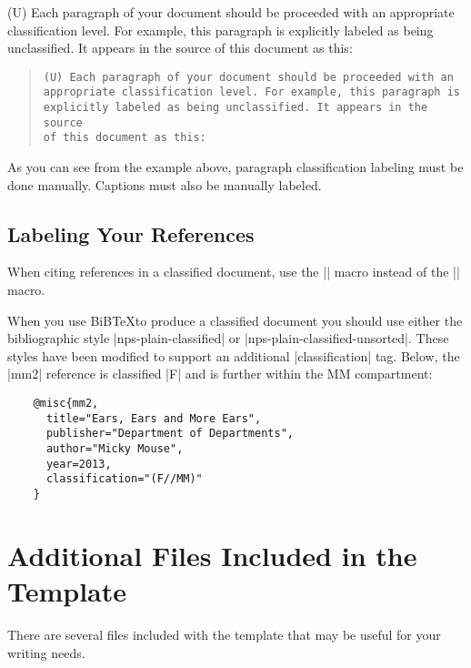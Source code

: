 (U) Each paragraph of your document should be proceeded with an
appropriate classification level. For example, this paragraph is
explicitly labeled as being unclassified. It appears in the source of
this document as this:

\begin{quotation}
\begin{Verbatim}[fontsize=\small]
(U) Each paragraph of your document should be proceeded with an
appropriate classification level. For example, this paragraph is
explicitly labeled as being unclassified. It appears in the source 
of this document as this:
\end{Verbatim}
\end{quotation}

As you can see from the example above, paragraph classification
labeling must be done manually. Captions must also be manually labeled.

\subsection{Labeling Your References}

When citing references in a classified document, use the
|\citeafter{}| macro instead of the |\cite{}| macro.

When you use BiB\TeX to produce a classified document you should use
either the bibliographic style |nps-plain-classified| or
|nps-plain-classified-unsorted|. These styles have been modified to
support an additional |classification| tag. Below, the |mm2| reference
is classified |F| and is further within the MM compartment:

\begin{Verbatim}
    @misc{mm2,
      title="Ears, Ears and More Ears",
      publisher="Department of Departments",
      author="Micky Mouse",
      year=2013,
      classification="(F//MM)"
    }
\end{Verbatim}

\section{Additional Files Included in the Template}
There are several files included with the template that may be useful for your writing needs.

